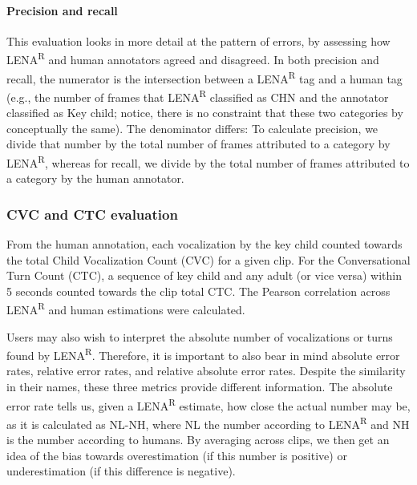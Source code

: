 \documentclass[english,table,man,floatsintext]{apa6}
\let\oldparagraph\paragraph
\renewcommand{\paragraph}[1]{\oldparagraph{#1}\mbox{}}
\begin{document}
\hypertarget{precision-and-recall}{%
\paragraph{Precision and recall}\label{precision-and-recall}}

This evaluation looks in more detail at the pattern of errors, by assessing how LENA\textsuperscript{R} and human annotators agreed and disagreed. In both precision and recall, the numerator is the intersection between a LENA\textsuperscript{R} tag and a human tag (e.g., the number of frames that LENA\textsuperscript{R} classified as CHN and the annotator classified as Key child; notice, there is no constraint that these two categories by conceptually the same). The denominator differs: To calculate precision, we divide that number by the total number of frames attributed to a category by LENA\textsuperscript{R}, whereas for recall, we divide by the total number of frames attributed to a category by the human annotator.

\hypertarget{cvc-and-ctc-evaluation}{%
\subsubsection{CVC and CTC evaluation}\label{cvc-and-ctc-evaluation}}

From the human annotation, each vocalization by the key child counted towards the total Child Vocalization Count (CVC) for a given clip. For the Conversational Turn Count (CTC), a sequence of key child and any adult (or vice versa) within 5 seconds counted towards the clip total CTC. The Pearson correlation across LENA\textsuperscript{R} and human estimations were calculated.

Users may also wish to interpret the absolute number of vocalizations or turns found by LENA\textsuperscript{R}. Therefore, it is important to also bear in mind absolute error rates, relative error rates, and relative absolute error rates. Despite the similarity in their names, these three metrics provide different information. The absolute error rate tells us, given a LENA\textsuperscript{R} estimate, how close the actual number may be, as it is calculated as NL-NH, where NL the number according to LENA\textsuperscript{R} and NH is the number according to humans. By averaging across clips, we then get an idea of the bias towards overestimation (if this number is positive) or underestimation (if this difference is negative).
\end{document}
